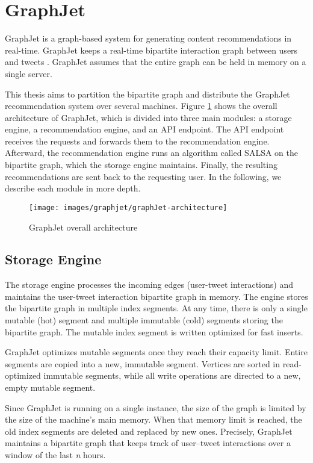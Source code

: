 \section{GraphJet}
\label{sec:GraphJet}
GraphJet is a graph-based system for generating content recommendations in real-time. GraphJet keeps a real-time bipartite interaction graph between users and tweets \cite{sharma2016graphjet}. GraphJet assumes that the entire graph can be held in memory on a single server.

This thesis aims to partition the bipartite graph and distribute the GraphJet recommendation system over several machines. Figure \ref{fig:graphJet-architecture} shows the overall architecture of GraphJet, which is divided into three main modules: a storage engine, a recommendation engine, and an API endpoint. The API endpoint receives the requests and forwards them to the recommendation engine. Afterward, the recommendation engine runs an algorithm called SALSA \cite{lempel2001salsa} on the bipartite graph, which the storage engine maintains. Finally, the resulting recommendations are sent back to the requesting user. In the following, we describe each module in more depth.

\begin{figure}[!h]
	\centering
	\texttt{[image: images/graphjet/graphJet-architecture]}
	\caption{GraphJet overall architecture}
	\label{fig:graphJet-architecture}
\end{figure}


\subsection{Storage Engine}
\label{subsec:GraphJet-Storage-Engine}
The storage engine processes the incoming edges (user-tweet interactions) and maintains the user-tweet interaction bipartite graph in memory. The engine stores the bipartite graph in multiple index segments. At any time, there is only a single mutable (hot) segment and multiple immutable (cold) segments storing the bipartite graph. The mutable index segment is written optimized for fast inserts. 

GraphJet optimizes mutable segments once they reach their capacity limit. Entire segments are copied into a new, immutable segment. Vertices are sorted in read-optimized immutable segments, while all write operations are directed to a new, empty mutable segment.

Since GraphJet is running on a single instance, the size of the graph is limited by the size of the machine's main memory. When that memory limit is reached, the old index segments are deleted and replaced by new ones. Precisely, GraphJet maintains a bipartite graph that keeps track of user–tweet interactions over a window of the last \textit{n} hours.

